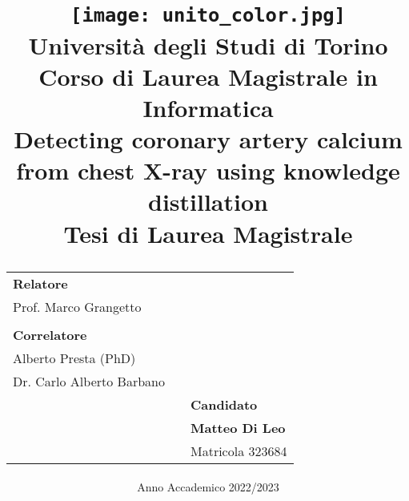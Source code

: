 \title{
    \vspace{-4cm}
    {\texttt{[image: unito\_color.jpg]}}\\ \vspace{1.5cm}
    \textbf{Università degli Studi di Torino}\\
    {\large Corso di Laurea Magistrale in Informatica}\\
    \vspace{1cm}
    \textbf{Detecting coronary artery calcium from chest X-ray using knowledge distillation}\\
    {\large Tesi di Laurea Magistrale}\\
    \vspace{1cm}
    \begin{tabular}{ l p{} l}
        \textbf{\large Relatore}\\
        {\large Prof. Marco Grangetto}\\
        \\
        \textbf{\large Correlatore}\\
        {\large Alberto Presta (PhD)}\\
        {\large Dr. Carlo Alberto Barbano}\\
        & & \textbf{\large Candidato}\\
        & & \textbf{\large Matteo Di Leo}\\
        & & {\large Matricola 323684}
    \end{tabular}
    \vspace{-5ex}
}
\date{Anno Accademico 2022/2023\vspace{-5ex}}
\author{}